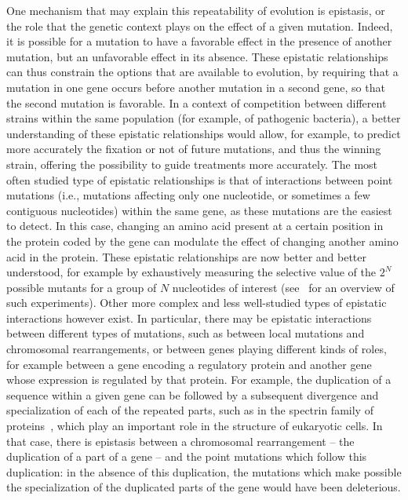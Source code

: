One mechanism that may explain this repeatability of evolution is epistasis, or the role that the genetic context plays on the effect of a given mutation.
Indeed, it is possible for a mutation to have a favorable effect in the presence of another mutation, but an unfavorable effect in its absence.
These epistatic relationships can thus constrain the options that are available to evolution, by requiring that a mutation in one gene occurs before another mutation in a second gene, so that the second mutation is favorable.
In a context of competition between different strains within the same population (for example, of pathogenic bacteria), a better understanding of these epistatic relationships would allow, for example, to predict more accurately the fixation or not of future mutations, and thus the winning strain, offering the possibility to guide treatments more accurately.
The most often studied type of epistatic relationships is that of interactions between point mutations (i.e., mutations affecting only one nucleotide, or sometimes a few contiguous nucleotides) within the same gene, as these mutations are the easiest to detect.
In this case, changing an amino acid present at a certain position in the protein coded by the gene can modulate the effect of changing another amino acid in the protein.
These epistatic relationships are now better and better understood, for example by exhaustively measuring the selective value of the $2^N$ possible mutants for a group of $N$ nucleotides of interest (see~\cite{achaz2014} for an overview of such experiments).
Other more complex and less well-studied types of epistatic interactions however exist.
In particular, there may be epistatic interactions between different types of mutations, such as between local mutations and chromosomal rearrangements, or between genes playing different kinds of roles, for example between a gene encoding a regulatory protein and another gene whose expression is regulated by that protein.
For example, the duplication of a sequence within a given gene can be followed by a subsequent divergence and specialization of each of the repeated parts, such as in the spectrin family of proteins~\citep{thomas1997}, which play an important role in the structure of eukaryotic cells.
In that case, there is epistasis between a chromosomal rearrangement -- the duplication of a part of a gene -- and the point mutations which follow this duplication: in the absence of this duplication, the mutations which make possible the specialization of the duplicated parts of the gene would have been deleterious.

